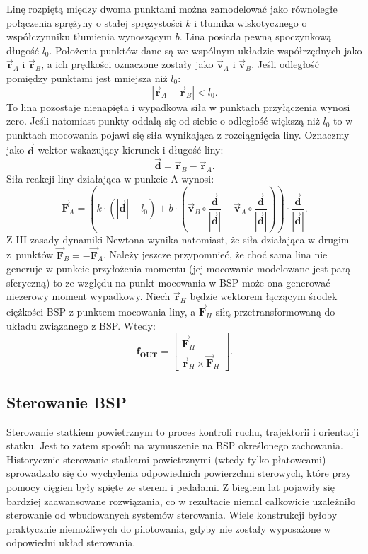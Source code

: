 Linę rozpiętą między dwoma punktami można zamodelować jako równoległe połączenia sprężyny o stałej sprężystości $k$ i tłumika wiskotycznego o współczynniku tłumienia wynoszącym $b$. Lina posiada pewną spoczynkową długość $l_0$. Położenia punktów dane są we wspólnym układzie współrzędnych jako $\vec{\bm{r}}_{A}$ i $\vec{\bm{r}}_{B}$, a ich prędkości oznaczone zostały jako $\vec{\bm{v}}_{A}$ i $\vec{\bm{v}}_{B}$. Jeśli odległość pomiędzy punktami jest mniejsza niż $l_0$:
\[
	| \vec{\bm{r}}_{A} - \vec{\bm{r}}_{B} | < l_0.
\]
To lina pozostaje nienapięta i wypadkowa siła w punktach przyłączenia wynosi zero. Jeśli natomiast punkty oddalą się od siebie o odległość większą niż $l_0$ to w punktach mocowania pojawi się siła wynikająca z rozciągnięcia liny. Oznaczmy jako $\vec{\bm{d}}$ wektor wskazujący kierunek i długość liny:
\[
	\vec{\bm{d}} =  \vec{\bm{r}}_{B} - \vec{\bm{r}}_{A}.
\]
Siła reakcji liny działająca w punkcie A wynosi:
\[
	\vec{\bm{F}}_{A} =\left(  k \cdot \left( |\vec{\bm{d}}| - l_0 \right) + b \cdot \left( \vec{\bm{v}}_{B}  \circ \frac{\vec{\bm{d}}}{|\vec{\bm{d}}|} - \vec{\bm{v}}_{A} \circ \frac{\vec{\bm{d}}}{|\vec{\bm{d}}|} \right) \right)  \cdot \frac{\vec{\bm{d}}}{|\vec{\bm{d}}|}.
\]
Z III zasady dynamiki Newtona wynika natomiast, że siła działająca w drugim z~punktów $\vec{\bm{F}}_{B} = - \vec{\bm{F}}_{A}$. Należy jeszcze przypomnieć, że choć sama lina nie generuje w punkcie przyłożenia momentu (jej mocowanie modelowane jest parą sferyczną) to ze względu na punkt mocowania w BSP może ona generować niezerowy moment wypadkowy. Niech $\vec{\bm{r}}_{H}$ będzie wektorem łączącym środek ciężkości BSP z punktem mocowania liny, a $\vec{\bm{F}}_{H}$ siłą przetransformowaną do układu związanego z BSP. Wtedy:
\[
	\bm{f_{OUT}} = \begin{bmatrix} \vec{\bm{F}}_{H} \\ \vec{\bm{r}}_{H} \times \vec{\bm{F}}_{H} \end{bmatrix}.
\]


\subsection{Sterowanie BSP}

Sterowanie statkiem powietrznym to proces kontroli ruchu, trajektorii i orientacji statku. Jest to zatem sposób na wymuszenie na BSP określonego zachowania. Historycznie sterowanie statkami powietrznymi (wtedy tylko płatowcami) sprowadzało się do wychylenia odpowiednich powierzchni sterowych, które przy pomocy cięgien były spięte ze sterem i pedałami. Z biegiem lat pojawiły się bardziej zaawansowane rozwiązania, co w rezultacie niemal całkowicie uzależniło sterowanie od wbudowanych systemów sterowania. Wiele konstrukcji byłoby praktycznie niemożliwych do pilotowania, gdyby nie zostały wyposażone w odpowiedni układ sterowania.\\


